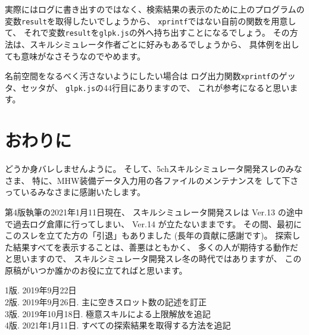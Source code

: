 \documentclass{jsarticle}
\begin{document}
実際にはログに書き出すのではなく、検索結果の表示のために上のプログラムの
変数\texttt{result}を取得したいでしょうから、
\texttt{xprintf}ではない自前の関数を用意して、
それで変数\texttt{result}を\texttt{glpk.js}の外へ持ち出すことになるでしょう。
その方法は、スキルシミュレータ作者ごとに好みもあるでしょうから、
具体例を出しても意味がなさそうなのでやめます。

名前空間をなるべく汚さないようにしたい場合は
ログ出力関数\texttt{xprintf}のゲッタ、セッタが、
\texttt{glpk.js}の44行目にありますので、
これが参考になると思います。

\section{おわりに}
どうか身バレしませんように。
そして、5chスキルシミュレータ開発スレのみなさま、
特に、MHW装備データ入力用の各ファイルのメンテナンスを
して下さっているみなさまに感謝いたします。

第4版執筆の2021年1月11日現在、
スキルシミュレータ開発スレは Ver.13 の途中で過去ログ倉庫に行ってしまい、
Ver.14 が立たないままです。
その間、最初にこのスレを立てた方の「引退」もありました (長年の貢献に感謝です)。
探索した結果すべてを表示することは、善悪はともかく、
多くの人が期待する動作だと思いますので、
スキルシミュレータ開発スレ冬の時代ではありますが、
この原稿がいつか誰かのお役に立てればと思います。
\bigskip

\noindent
1版. 2019年9月22日\\
2版. 2019年9月26日. 主に空きスロット数の記述を訂正 \\
3版. 2019年10月18日. 極意スキルによる上限解放を追記 \\
4版. 2021年1月11日. すべての探索結果を取得する方法を追記
\end{document}
